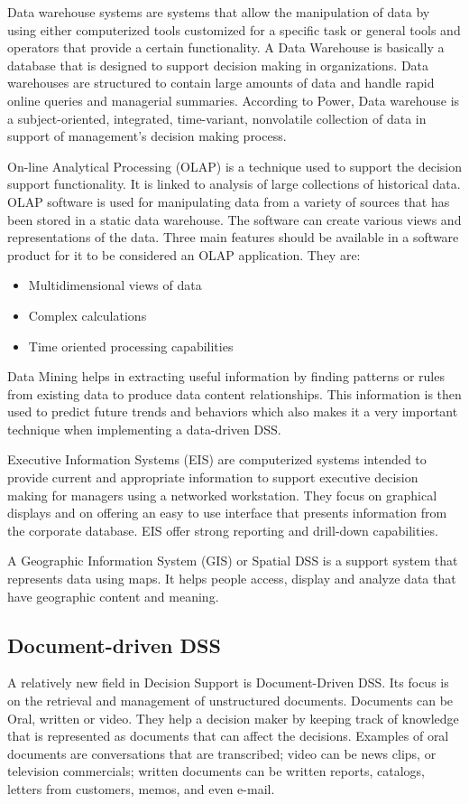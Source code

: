 \indent Data warehouse systems are systems that allow the manipulation of data by using either computerized tools customized for a specific task or general tools and operators that provide a certain functionality. A Data Warehouse is basically a database that is designed to support decision making in organizations. Data warehouses are structured to contain large amounts of data and handle rapid online queries and managerial summaries. According to Power\cite{power2007brief}, Data warehouse is a subject-oriented, integrated, time-variant, nonvolatile collection of data in support of management's decision making process.

\indent On-line Analytical Processing (OLAP) is a technique used to support the decision support functionality. It is linked to analysis of large collections of historical data.\cite{DDSTypes} OLAP software is used for manipulating data from a variety of sources that has been stored in a static data warehouse. The software can create various views and representations of the data.\cite{DDSTypes} Three main features should be available in a software product for it to be considered an OLAP application. They are: 
\begin{itemize}
\item Multidimensional views of data
\item Complex calculations
\item Time oriented processing capabilities
\end{itemize}
\indent Data Mining helps in extracting useful information by finding patterns or rules from existing data to produce data content relationships. This information is then used to predict future trends and behaviors which also makes it a very important technique when implementing a data-driven DSS.

\indent Executive Information Systems (EIS) are computerized systems intended to provide current and appropriate information to support executive decision making for managers using a networked workstation. They focus on graphical displays and on offering an easy to use interface that presents information from the corporate database. EIS offer strong reporting and drill-down capabilities.\cite{DDSTypes}

\indent A Geographic Information System (GIS) or Spatial DSS is a support system that represents data using maps. It helps people access, display and analyze data that have geographic content and meaning.\cite{DDSTypes}
\subsection{Document-driven DSS}
\label{subsec:DocumentDrivenDSS}
A relatively new field in Decision Support is Document-Driven DSS. Its focus is on the retrieval and management of unstructured documents. Documents can be Oral, written or video. They help a decision maker by keeping track of knowledge that is represented as documents that can affect the decisions.\cite{power2002building} Examples of oral documents are conversations that are transcribed; video can be news clips, or television commercials; written documents can be written reports, catalogs, letters from customers, memos, and even e-mail.\cite{DDSTypes}
